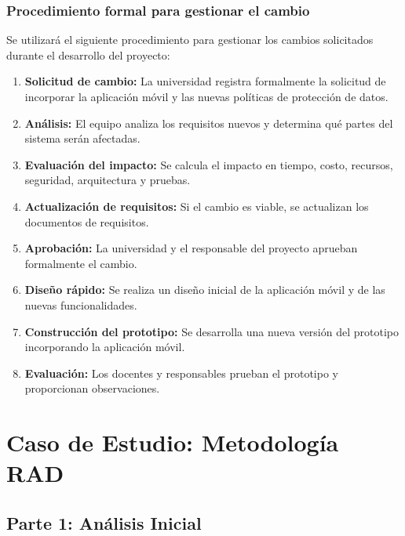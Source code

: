 \documentclass[pdflatex,sn-mathphys-num]{sn-jnl}%
\theoremstyle{thmstyleone}%
\theoremstyle{thmstyletwo}%
\theoremstyle{thmstylethree}%
\begin{document}
 
 \subsubsection{Procedimiento formal para gestionar el cambio}
 
Se utilizará el siguiente procedimiento para gestionar los cambios solicitados durante el desarrollo del proyecto:

\begin{enumerate}
	\item \textbf{Solicitud de cambio:} La universidad registra formalmente la solicitud de incorporar la aplicación móvil y las nuevas políticas de protección de datos.
	
	\item \textbf{Análisis:} El equipo analiza los requisitos nuevos y determina qué partes del sistema serán afectadas.
	
	\item \textbf{Evaluación del impacto:} Se calcula el impacto en tiempo, costo, recursos, seguridad, arquitectura y pruebas.
	
	\item \textbf{Actualización de requisitos:} Si el cambio es viable, se actualizan los documentos de requisitos.
	
	\item \textbf{Aprobación:} La universidad y el responsable del proyecto aprueban formalmente el cambio.
	
	\item \textbf{Diseño rápido:} Se realiza un diseño inicial de la aplicación móvil y de las nuevas funcionalidades.
	
	\item \textbf{Construcción del prototipo:} Se desarrolla una nueva versión del prototipo incorporando la aplicación móvil.
	
	\item \textbf{Evaluación:} Los docentes y responsables prueban el prototipo y proporcionan observaciones.
\end{enumerate}
 
 \section{Caso de Estudio: Metodología RAD}\label{sec:rad}
 \subsection{Parte 1: Análisis Inicial}
\end{document}
